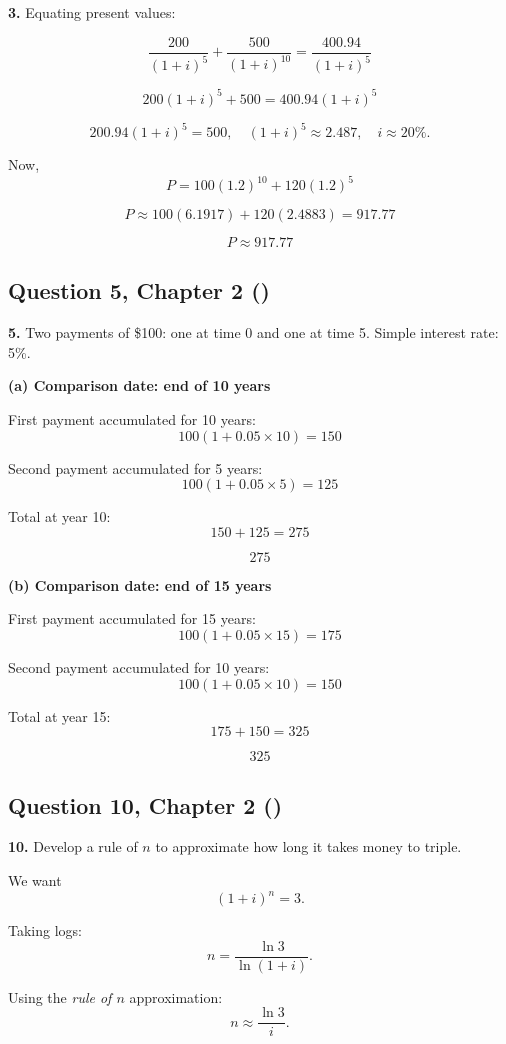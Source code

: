 \documentclass[12pt, a4paper]{article}
\begin{document}
\textbf{3.} Equating present values:

\[
\frac{200}{(1+i)^5} + \frac{500}{(1+i)^{10}} 
= \frac{400.94}{(1+i)^5}
\]

\[
200(1+i)^5 + 500 = 400.94(1+i)^5
\]

\[
200.94(1+i)^5 = 500, 
\quad (1+i)^5 \approx 2.487, 
\quad i \approx 20\%.
\]

Now,
\[
P = 100(1.2)^{10} + 120(1.2)^5
\]

\[
P \approx 100(6.1917) + 120(2.4883) = 917.77
\]

\[
\boxed{P \approx 917.77}
\]


\subsection*{Question 5, Chapter 2 (\cite{toi3rd})}

\textbf{5.} Two payments of \$100: one at time 0 and one at time 5.  
Simple interest rate: 5\%.

\bigskip
\textbf{(a) Comparison date: end of 10 years}

First payment accumulated for 10 years:
\[
100(1+0.05 \times 10) = 150
\]

Second payment accumulated for 5 years:
\[
100(1+0.05 \times 5) = 125
\]

Total at year 10:
\[
150 + 125 = 275
\]

\[
\boxed{275}
\]

\bigskip
\textbf{(b) Comparison date: end of 15 years}

First payment accumulated for 15 years:
\[
100(1+0.05 \times 15) = 175
\]

Second payment accumulated for 10 years:
\[
100(1+0.05 \times 10) = 150
\]

Total at year 15:
\[
175 + 150 = 325
\]

\[
\boxed{325}
\]


\subsection*{Question 10, Chapter 2 (\cite{toi3rd})}

\textbf{10.} Develop a rule of \(n\) to approximate how long it takes money to triple.

We want
\[
(1+i)^n = 3.
\]

Taking logs:
\[
n = \frac{\ln 3}{\ln(1+i)}.
\]

Using the \emph{rule of \(n\)} approximation:
\[
n \approx \frac{\ln 3}{i}.
\]
\end{document}
